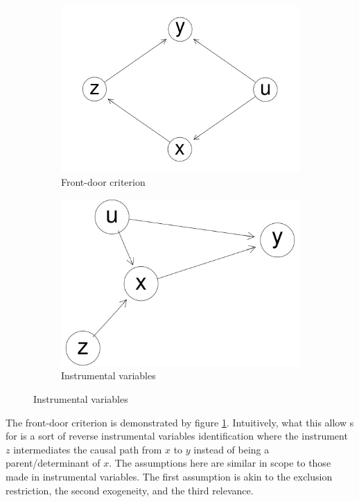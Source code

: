 \documentclass{article}
\begin{document}
\begin{figure}
  \centering
  \begin{subfigure}{0.45\textwidth}
    \includegraphics[width=\linewidth]{images/frontdoor.png} 
    \caption{Front-door criterion}
    \label{dag8_fd}
  \end{subfigure}
  \begin{subfigure}{0.45\textwidth}
    \includegraphics[width=\linewidth]{images/iv.png}
    \caption{Instrumental variables}
    \label{dag8_iv}
  \end{subfigure}
\end{figure}

The front-door criterion is demonstrated by figure \ref{dag8_fd}. Intuitively, what this allow s for is a sort of reverse instrumental variables identification where the instrument $z$ intermediates the causal path from $x$ to $y$ instead of being a parent/determinant of $x$. The assumptions here are similar in scope to those made in instrumental variables. The first assumption is akin to the exclusion restriction, the second exogeneity, and the third relevance.
\end{document}
